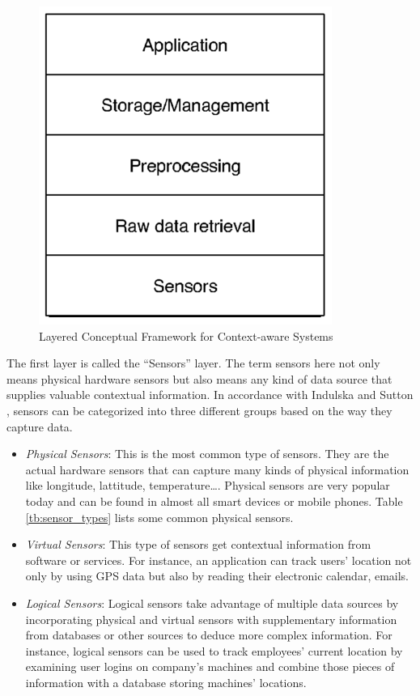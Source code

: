 \begin{figure}[!h]
\begin{centering}
\includegraphics[scale=0.6]{pics/context_aware_systems}
\caption{Layered Conceptual Framework for Context-aware Systems}\label{fig:context_aware_systems}
\end{centering}
\end{figure}

The first layer is called the ``Sensors'' layer. The term sensors here not only means physical hardware sensors but also means any kind of data source that supplies valuable contextual information. In accordance with Indulska and Sutton \cite{indulska2003location}, sensors can be categorized into three different groups based on the way they capture data.

\begin{itemize}
    \item \textit{Physical Sensors}: This is the most common type of sensors. They are the actual hardware sensors that can capture many kinds of physical information like longitude, lattitude, temperature\ldots. Physical sensors are very popular today and can be found in almost all smart devices or mobile phones. Table \ref{tb:sensor_types} lists some common physical sensors.
    \item \textit{Virtual Sensors}: This type of sensors get contextual information from software or services. For instance, an application can track users' location not only by using GPS data but also by reading their electronic calendar, emails. 
    \item \textit{Logical Sensors}: Logical sensors take advantage of multiple data sources by incorporating physical and virtual sensors with supplementary information from databases or other sources to deduce more complex information. For instance, logical sensors can be used to track employees' current location by examining user logins on company's machines and combine those pieces of information with a database storing machines' locations.
\end{itemize}

